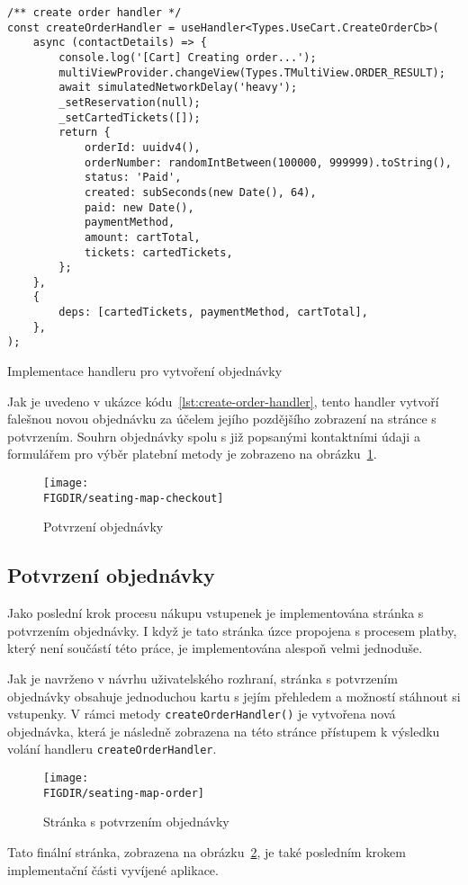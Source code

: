 \begin{listing}[H]
\begin{verbatim}
/** create order handler */
const createOrderHandler = useHandler<Types.UseCart.CreateOrderCb>(
	async (contactDetails) => {
		console.log('[Cart] Creating order...');
		multiViewProvider.changeView(Types.TMultiView.ORDER_RESULT);
		await simulatedNetworkDelay('heavy');
		_setReservation(null);
		_setCartedTickets([]);
		return {
			orderId: uuidv4(),
			orderNumber: randomIntBetween(100000, 999999).toString(),
			status: 'Paid',
			created: subSeconds(new Date(), 64),
			paid: new Date(),
			paymentMethod,
			amount: cartTotal,
			tickets: cartedTickets,
		};
	},
	{
		deps: [cartedTickets, paymentMethod, cartTotal],
	},
);
\end{verbatim}
\caption{Implementace handleru pro vytvoření objednávky}
\label{lst:create-order-handler}
\end{listing}

Jak je uvedeno v ukázce kódu~\ref{lst:create-order-handler}, tento handler vytvoří falešnou novou objednávku za účelem jejího pozdějšího zobrazení na stránce s potvrzením.
Souhrn objednávky spolu s již popsanými kontaktními údaji a formulářem pro výběr platební metody je zobrazeno na obrázku~\ref{fig:seating-map-checkout}.

\begin{figure}[H]
	\centering
	\texttt{[image: \\FIGDIR/seating-map-checkout]}
	\caption{Potvrzení objednávky}
	\label{fig:seating-map-checkout}
\end{figure}

\subsection{Potvrzení objednávky}
\label{subsec:implementace-checkout-order-confirmation}
Jako poslední krok procesu nákupu vstupenek je implementována stránka s potvrzením objednávky.
I když je tato stránka úzce propojena s procesem platby, který není součástí této práce, je implementována alespoň velmi jednoduše.

Jak je navrženo v návrhu uživatelského rozhraní, stránka s potvrzením objednávky obsahuje jednoduchou kartu s jejím přehledem a možností stáhnout si vstupenky.
V rámci metody \texttt{createOrderHandler()} je vytvořena nová objednávka, která je následně zobrazena na této stránce přístupem k výsledku volání handleru \texttt{createOrderHandler}.

\begin{figure}[H]
	\centering
	\texttt{[image: \\FIGDIR/seating-map-order]}
	\caption{Stránka s potvrzením objednávky}
	\label{fig:seating-map-order}
\end{figure}

Tato finální stránka, zobrazena na obrázku~\ref{fig:seating-map-order}, je také posledním krokem implementační části vyvíjené aplikace.
